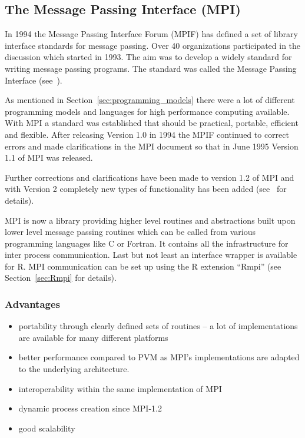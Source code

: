 \subsection{The Message Passing Interface (MPI)}
\label{sec:MPI}

In 1994 the Message Passing Interface Forum (MPIF) has defined a set
of library interface standards for message passing. Over 40
organizations participated in the discussion which started in
1993. The aim was to develop a widely standard for writing
message passing programs. The standard was called the Message Passing
Interface (see~\cite{forum94:MPI}).

As mentioned in Section~\ref{sec:programming_models} there
were a lot of different programming models and languages for high
performance computing available. With MPI a standard was established
that should be practical, portable, efficient and flexible. After
releasing Version 1.0 in 1994 the MPIF continued to correct errors and
made clarifications in the MPI document so that in June 1995 Version
1.1 of MPI was released.

Further corrections and clarifications have been made to version 1.2 of
MPI and with Version 2 completely new types of functionality has been
added (see~\cite{forum94:MPI-2} for details).

MPI is now a library providing higher level
routines and abstractions built upon lower level message passing
routines which can be called from various programming
languages like C or Fortran. It contains all the infrastructure for
inter process communication. Last but not least an interface wrapper
is available for R. MPI communication can be set up using the R extension
``Rmpi'' (see Section~\ref{sec:Rmpi} for details).

\subsubsection{Advantages}
\begin{itemize}
\item portability through clearly defined sets of routines -- a lot of
  implementations are available for many different platforms
\item better performance compared to PVM as MPI's implementations are
  adapted to the underlying architecture.
\item interoperability within the same implementation of MPI
\item dynamic process creation since MPI-1.2
\item good scalability
\end{itemize} 


